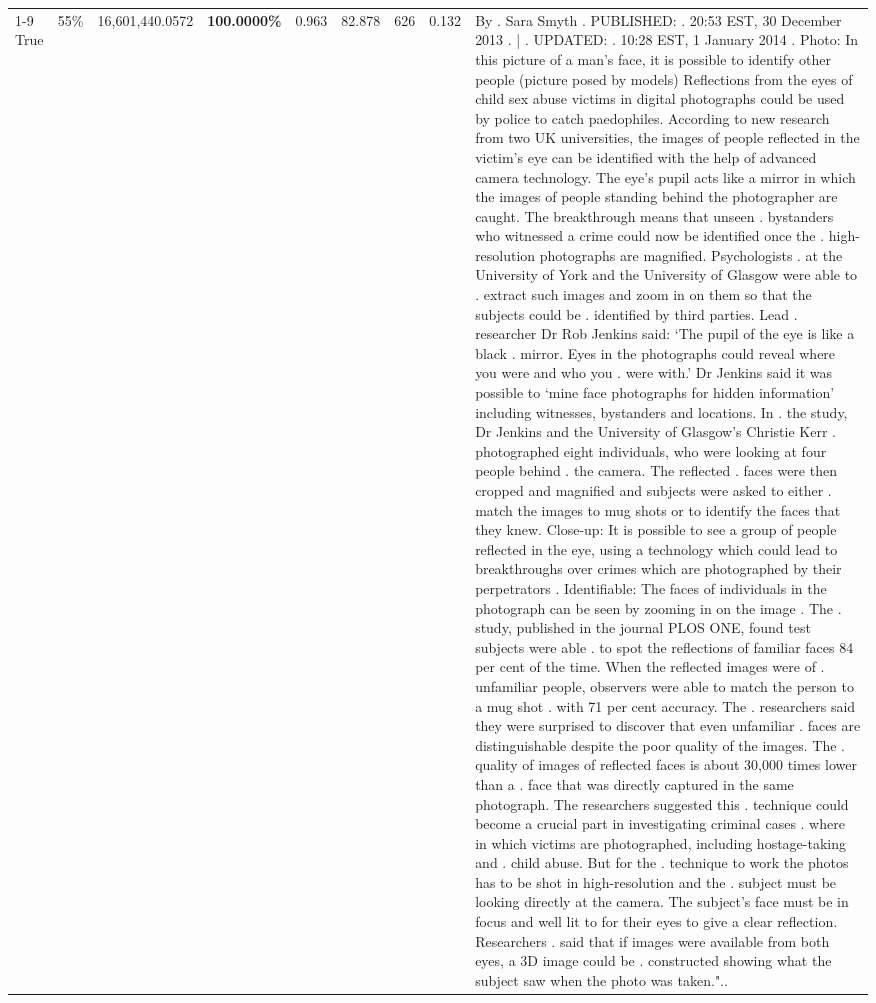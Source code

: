 \begin{table}[H]
\begin{tabular}{lllrlllll}
\cline{1-9} \cline{2-9}
True & 55\% & 16,601,440.0572 & \bfseries \color{red} 100.0000\% & 0.963 & 82.878 & 626 & 0.132 & By . Sara Smyth . PUBLISHED: . 20:53 EST, 30 December 2013 . | . UPDATED: . 10:28 EST, 1 January 2014 . Photo: In this picture of a man's face, it is possible to identify other people (picture posed by models) Reflections from the eyes of child sex abuse victims in digital photographs could be used by police to catch paedophiles. According to new research from two UK universities, the images of people reflected in the victim's eye can be identified with the help of advanced camera technology. The eye's pupil acts like a mirror in which the images of people standing behind the photographer are caught. The breakthrough means that unseen . bystanders who witnessed a crime could now be identified once the . high-resolution photographs are magnified. Psychologists . at the University of York and the University of Glasgow were able to . extract such images and zoom in on them so that the subjects could be . identified by third parties. Lead . researcher Dr Rob Jenkins said: ‘The pupil of the eye is like a black . mirror. Eyes in the photographs could reveal where you were and who you . were with.' Dr Jenkins said it was possible to ‘mine face photographs for hidden information' including witnesses, bystanders and locations. In . the study, Dr Jenkins and the University of Glasgow's Christie Kerr . photographed eight individuals, who were looking at four people behind . the camera. The reflected . faces were then cropped and magnified and subjects were asked to either . match the images to mug shots or to identify the faces that they knew. Close-up: It is possible to see a group of people reflected in the eye, using a technology which could lead to breakthroughs over crimes which are photographed by their perpetrators . Identifiable: The faces of individuals in the photograph can be seen by zooming in on the image . The . study, published in the journal PLOS ONE, found test subjects were able . to spot the reflections of familiar faces 84 per cent of the time. When the reflected images were of . unfamiliar people, observers were able to match the person to a mug shot . with 71 per cent accuracy. The . researchers said they were surprised to discover that even unfamiliar . faces are distinguishable despite the poor quality of the images. The . quality of images of reflected faces is about 30,000 times lower than a . face that was directly captured in the same photograph. The researchers suggested this . technique could become a crucial part in investigating criminal cases . where in which victims are photographed, including hostage-taking and . child abuse. But for the . technique to work the photos has to be shot in high-resolution and the . subject must be looking directly at the camera. The subject's face must be in focus and well lit to for their eyes to give a clear reflection. Researchers . said that if images were available from both eyes, a 3D image could be . constructed showing what the subject saw when the photo was taken.".. \\

\end{tabular}
\end{table}
